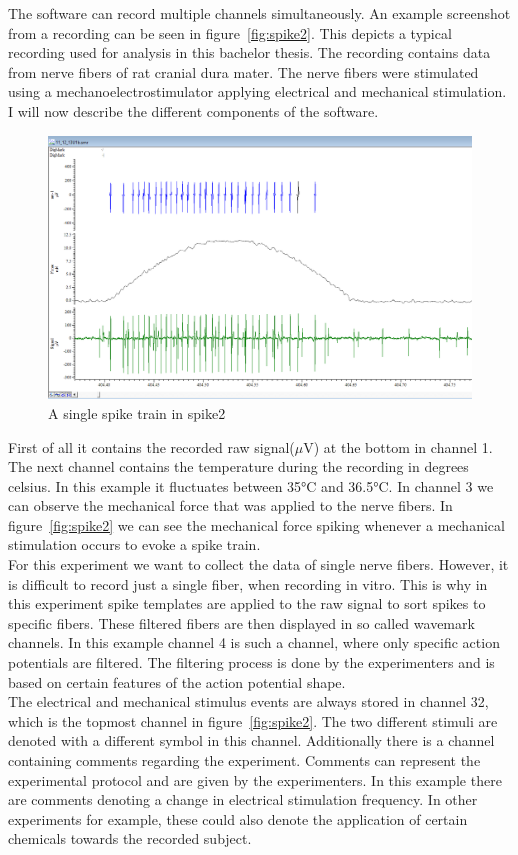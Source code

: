 The software can record multiple channels simultaneously. An example screenshot from a recording can be seen in figure~\ref{fig:spike2}. This depicts a typical recording used for analysis in this bachelor thesis. The recording contains data from nerve fibers of rat cranial dura mater. The nerve fibers were stimulated using a mechanoelectrostimulator applying electrical and mechanical stimulation. I will now describe the different components of the software.\\

\begin{figure}
	\includegraphics[width = \textwidth]{src/pic/Spike2_spike_train}
	\caption{A single spike train in spike2}
	\label{fig:spike_train}
\end{figure}

First of all it contains the recorded raw signal($\mu$V) at the bottom in channel 1. The next channel contains the temperature during the recording in degrees celsius. In this example it fluctuates between 35°C and 36.5°C. In channel 3 we can observe the mechanical force that was applied to the nerve fibers. In figure~\ref{fig:spike2} we can see the mechanical force spiking whenever a mechanical stimulation occurs to evoke a spike train. \\
For this experiment we want to collect the data of single nerve fibers. However, it is difficult to record just a single fiber, when recording in vitro. This is why in this experiment spike templates are applied to the raw signal to sort spikes to specific fibers. These filtered fibers are then displayed in so called wavemark channels. In this example channel 4 is such a channel, where only specific action potentials are filtered. The filtering process is done by the experimenters and is based on certain features of the action potential shape.\\
The electrical and mechanical stimulus events are always stored in channel 32, which is the topmost channel in figure~\ref{fig:spike2}. The two different stimuli are denoted with a different symbol in this channel. Additionally there is a channel containing comments regarding the experiment. Comments can represent the experimental protocol and are given by the experimenters. In this example there are comments denoting a change in electrical stimulation frequency. In other experiments for example, these could also denote the application of certain chemicals towards the recorded subject.

